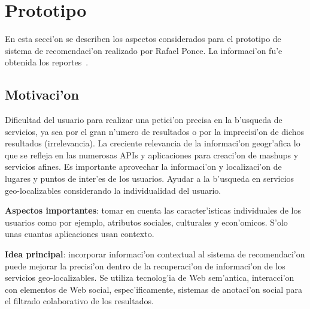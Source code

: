\documentclass[11pt]{article}
\begin{document}
\section{Prototipo}
En esta secci'on se describen los aspectos considerados para el prototipo de sistema de recomendaci'on realizado por Rafael Ponce. La informaci'on fu'e obtenida los reportes~\cite{rep1:isra,rep2:isra}.

\subsection{Motivaci'on}
Dificultad del usuario para realizar una petici'on precisa en la b'usqueda de servicios, ya sea por el gran n'umero de resultados o por la imprecisi'on de dichos resultados (irrelevancia). La creciente relevancia de la informaci'on geogr'afica lo que se refleja en las numerosas APIs y aplicaciones para creaci'on de mashups y servicios afines. Es importante aprovechar la informaci'on y localizaci'on de lugares y puntos de inter'es de los usuarios. Ayudar a la b'usqueda en servicios geo-localizables considerando la individualidad del usuario.

\textbf{Aspectos importantes}: tomar en cuenta las caracter'isticas individuales de los usuarios como por ejemplo, atributos sociales, culturales y econ'omicos. S'olo unas cuantas aplicaciones usan contexto.

\textbf{Idea principal}: incorporar informaci'on contextual al sistema de recomendaci'on puede mejorar la precisi'on dentro de la recuperaci'on de informaci'on de los servicios geo-localizables. Se utiliza tecnolog'ia de Web sem'antica, interacci'on con elementos de Web social, espec'ificamente, sistemas de anotaci'on social para el filtrado colaborativo de los resultados.
\end{document}
